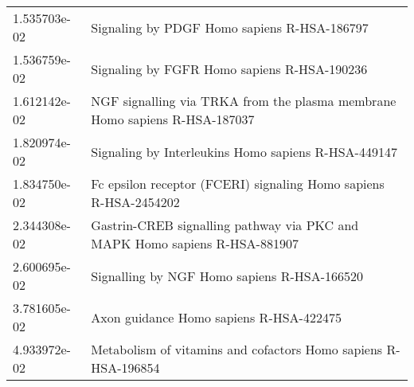 \begin{longtable}{p{2.4cm}p{14.5cm}}
             1.535703e-02 &                                                   Signaling by PDGF Homo sapiens R-HSA-186797 \\
             1.536759e-02 &                                                   Signaling by FGFR Homo sapiens R-HSA-190236 \\
             1.612142e-02 &                    NGF signalling via TRKA from the plasma membrane Homo sapiens R-HSA-187037 \\
             1.820974e-02 &                                           Signaling by Interleukins Homo sapiens R-HSA-449147 \\
             1.834750e-02 &                              Fc epsilon receptor (FCERI) signaling Homo sapiens R-HSA-2454202 \\
             2.344308e-02 &                    Gastrin-CREB signalling pathway via PKC and MAPK Homo sapiens R-HSA-881907 \\
             2.600695e-02 &                                                   Signalling by NGF Homo sapiens R-HSA-166520 \\
             3.781605e-02 &                                                       Axon guidance Homo sapiens R-HSA-422475 \\
             4.933972e-02 &                                Metabolism of vitamins and cofactors Homo sapiens R-HSA-196854 \\
\end{longtable}


